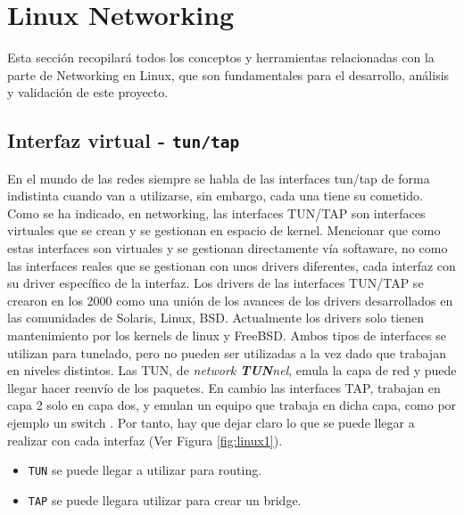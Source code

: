 \section{Linux Networking}
\label{sec:linuxNetworking}

Esta sección recopilará todos los conceptos y herramientas relacionadas con la parte de Networking en Linux, que son fundamentales para el desarrollo, análisis y validación de este proyecto.



\subsection{Interfaz virtual - \texttt{tun/tap}}
\label{linuxNetworking_tuntap}

En el mundo de las redes siempre se habla de las interfaces tun/tap de forma indistinta cuando van a utilizarse, sin embargo, cada una tiene su cometido. Como se ha indicado, en networking, las interfaces TUN/TAP son interfaces virtuales que se crean y se gestionan en espacio de kernel. Mencionar que como estas interfaces son virtuales y se gestionan directamente vía softaware, no como las interfaces reales que se gestionan con unos drivers diferentes, cada interfaz con su driver específico de la interfaz.  Los drivers de las interfaces TUN/TAP se crearon en los 2000 como una unión de los avances de los drivers desarrollados en las comunidades de Solaris, Linux, BSD. Actualmente los drivers solo tienen mantenimiento por los kernels de linux y FreeBSD. Ambos tipos de interfaces se utilizan para tunelado, pero no pueden ser utilizadas a la vez dado que trabajan en niveles distintos. Las TUN, de \textit{network \textbf{TUN}nel}, emula la capa de red y puede llegar hacer reenvío de los paquetes. En cambio las interfaces TAP,  trabajan en capa 2 solo en capa dos, y emulan un equipo que trabaja en dicha capa, como por ejemplo un switch \cite{tuntap1}. Por tanto, hay que dejar claro lo que se puede llegar a realizar con cada interfaz (Ver Figura \ref{fig:linux1}).

\begin{itemize}
    \item \texttt{TUN} se puede llegar a utilizar para routing.
    \item \texttt{TAP} se puede llegara utilizar para crear un bridge.
\end{itemize}

